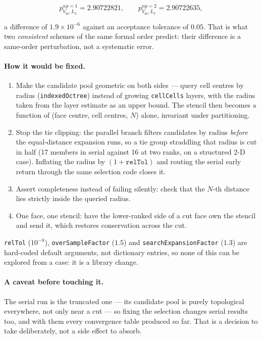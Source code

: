 \documentclass[11pt,a4paper]{article}
\newcommand{\code}[1]{\texttt{\small #1}}
\begin{document}
\[
  p^{np=1}_{V_{\mathrm{m}},L_2} = 2.90722821,
  \qquad
  p^{np=2}_{V_{\mathrm{m}},L_2} = 2.90722635,
\]

a difference of $1.9\times10^{-6}$ against an acceptance tolerance of $0.05$.
That is what two \emph{consistent} schemes of the same formal order predict:
their difference is a same-order perturbation, not a systematic error.

\paragraph{How it would be fixed.}
\begin{enumerate}
  \item Make the candidate pool geometric on both sides --- query cell centres
        by radius (\code{indexedOctree}) instead of growing \code{cellCells}
        layers, with the radius taken from the layer estimate as an upper bound.
        The stencil then becomes a function of (face centre, cell centres, $N$)
        alone, invariant under partitioning.
  \item Stop the tie clipping: the parallel branch filters candidates by radius
        \emph{before} the equal-distance expansion runs, so a tie group
        straddling that radius is cut in half (17 members in serial against 16 at
        two ranks, on a structured 2-D case). Inflating the radius by
        $(1+\texttt{relTol})$ and routing the serial early return through the
        same selection code closes it.
  \item Assert completeness instead of failing silently: check that the $N$-th
        distance lies strictly inside the queried radius.
  \item One face, one stencil: have the lower-ranked side of a cut face own the
        stencil and send it, which restores conservation across the cut.
\end{enumerate}

\code{relTol} ($10^{-8}$), \code{overSampleFactor} ($1.5$) and
\code{searchExpansionFactor} ($1.3$) are hard-coded default arguments, not
dictionary entries, so none of this can be explored from a case: it is a library
change.

\paragraph{A caveat before touching it.} The serial run is the truncated one ---
its candidate pool is purely topological everywhere, not only near a cut --- so
fixing the selection changes serial results too, and with them every convergence
table produced so far. That is a decision to take deliberately, not a side
effect to absorb.
\end{document}
